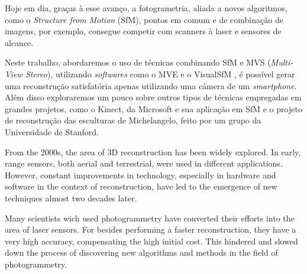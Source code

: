 \documentclass[a4paper,12pt,oneside,onecolumn,final,fleqn]{repUERJ}
\theoremstyle{plain}
\theoremstyle{definition}
\begin{document}
Hoje em dia, graças à esse avanço, a fotogrametria, aliada a novos algoritmos, como o {\it Structure from Motion} (SfM), pontos em comum e de combinação de imagens, por exemplo, consegue competir com scanners à laser e sensores de alcance. 

Neste trabalho, abordaremos o uso de técnicas combinando SfM e MVS ({\it Multi-View Stereo}), utilizando {\it softwares} como o MVE \cite{mve} e o VisualSfM \cite{wu2011visualsfm}, é possível gerar uma reconstrução satisfatória apenas utilizando uma câmera de um {\it smartphone}. Além disso exploraremos um pouco sobre outros tipos de técnicas empregadas em grandes projetos, como o Kinect, da Microsoft e sua aplicação em SfM e o projeto de reconstrução das esculturas de Michelangelo, feito por um grupo da Universidade de Stanford.





\imprimirchaves




From the 2000s, the area of ​​3D reconstruction has been widely explored. In early, range sensors, both aerial and terrestrial, were used in different applications. However, constant improvements in technology, especially in hardware and software in the context of reconstruction, have led to the emergence of new techniques almost two decades later. 

Many scientists wich used photogrammetry have converted their efforts into the area of ​​laser sensors. For besides performing a faster reconstruction, they have a very high accuracy, compensating the high initial cost. This hindered and slowed down the process of discovering new algorithms and methods in the field of photogrammetry. 
\end{document}
